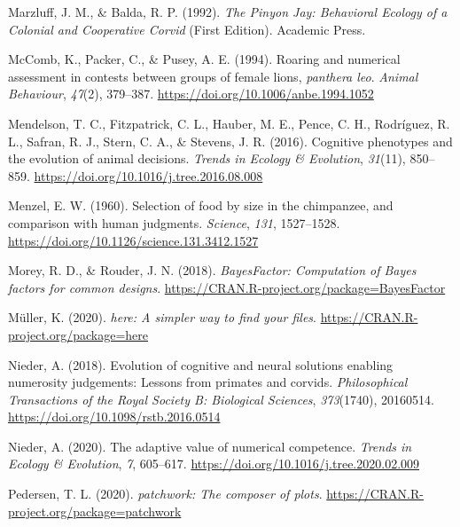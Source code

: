 \documentclass[
  ,pub,floatsintext]{apa6}
\newlength{\cslhangindent}
\newlength{\cslentryspacingunit} %
\newenvironment{CSLReferences}[2] %
 {%
  \setlength{\parindent}{0pt}
  \ifodd #1
  \let\oldpar\par
  \def\par{\hangindent=\cslhangindent\oldpar}
  \fi
  \setlength{\parskip}{#2\cslentryspacingunit}
 }%
 {}
\begin{document}
\begin{CSLReferences}{1}{0}
\leavevmode{}%
Marzluff, J. M., \& Balda, R. P. (1992). \emph{The {Pinyon} {Jay}: {Behavioral} {Ecology} of a {Colonial} and {Cooperative} {Corvid}} (First Edition). Academic Press.

\leavevmode{}%
McComb, K., Packer, C., \& Pusey, A. E. (1994). Roaring and numerical assessment in contests between groups of female lions, \emph{panthera leo}. \emph{Animal Behaviour}, \emph{47}(2), 379--387. \url{https://doi.org/10.1006/anbe.1994.1052}

\leavevmode{}%
Mendelson, T. C., Fitzpatrick, C. L., Hauber, M. E., Pence, C. H., Rodríguez, R. L., Safran, R. J., Stern, C. A., \& Stevens, J. R. (2016). Cognitive phenotypes and the evolution of animal decisions. \emph{Trends in Ecology \& Evolution}, \emph{31}(11), 850--859. \url{https://doi.org/10.1016/j.tree.2016.08.008}

\leavevmode{}%
Menzel, E. W. (1960). Selection of food by size in the chimpanzee, and comparison with human judgments. \emph{Science}, \emph{131}, 1527--1528. \url{https://doi.org/10.1126/science.131.3412.1527}

\leavevmode{}%
Morey, R. D., \& Rouder, J. N. (2018). \emph{BayesFactor: Computation of {Bayes} factors for common designs}. \url{https://CRAN.R-project.org/package=BayesFactor}

\leavevmode{}%
Müller, K. (2020). \emph{{here}: A simpler way to find your files}. \url{https://CRAN.R-project.org/package=here}

\leavevmode{}%
Nieder, A. (2018). Evolution of cognitive and neural solutions enabling numerosity judgements: Lessons from primates and corvids. \emph{Philosophical Transactions of the Royal Society B: Biological Sciences}, \emph{373}(1740), 20160514. \url{https://doi.org/10.1098/rstb.2016.0514}

\leavevmode{}%
Nieder, A. (2020). The adaptive value of numerical competence. \emph{Trends in Ecology \& Evolution}, \emph{7}, 605--617. \url{https://doi.org/10.1016/j.tree.2020.02.009}

\leavevmode{}%
Pedersen, T. L. (2020). \emph{{patchwork}: The composer of plots}. \url{https://CRAN.R-project.org/package=patchwork}


\end{CSLReferences}
\end{document}
